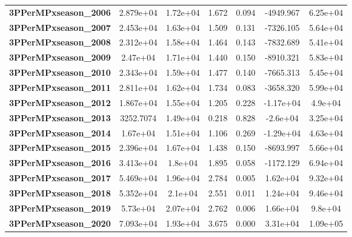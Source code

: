 \begin{center}
\begin{tabular}{lcccccc}
\textbf{3PPerMPxseason\_2006} &    2.879e+04  &     1.72e+04     &     1.672  &         0.094        &    -4949.967    &     6.25e+04     \\
\textbf{3PPerMPxseason\_2007} &    2.453e+04  &     1.63e+04     &     1.509  &         0.131        &    -7326.105    &     5.64e+04     \\
\textbf{3PPerMPxseason\_2008} &    2.312e+04  &     1.58e+04     &     1.464  &         0.143        &    -7832.689    &     5.41e+04     \\
\textbf{3PPerMPxseason\_2009} &     2.47e+04  &     1.71e+04     &     1.440  &         0.150        &    -8910.321    &     5.83e+04     \\
\textbf{3PPerMPxseason\_2010} &    2.343e+04  &     1.59e+04     &     1.477  &         0.140        &    -7665.313    &     5.45e+04     \\
\textbf{3PPerMPxseason\_2011} &    2.811e+04  &     1.62e+04     &     1.734  &         0.083        &    -3658.320    &     5.99e+04     \\
\textbf{3PPerMPxseason\_2012} &    1.867e+04  &     1.55e+04     &     1.205  &         0.228        &    -1.17e+04    &      4.9e+04     \\
\textbf{3PPerMPxseason\_2013} &    3252.7074  &     1.49e+04     &     0.218  &         0.828        &     -2.6e+04    &     3.25e+04     \\
\textbf{3PPerMPxseason\_2014} &     1.67e+04  &     1.51e+04     &     1.106  &         0.269        &    -1.29e+04    &     4.63e+04     \\
\textbf{3PPerMPxseason\_2015} &    2.396e+04  &     1.67e+04     &     1.438  &         0.150        &    -8693.997    &     5.66e+04     \\
\textbf{3PPerMPxseason\_2016} &    3.413e+04  &      1.8e+04     &     1.895  &         0.058        &    -1172.129    &     6.94e+04     \\
\textbf{3PPerMPxseason\_2017} &    5.469e+04  &     1.96e+04     &     2.784  &         0.005        &     1.62e+04    &     9.32e+04     \\
\textbf{3PPerMPxseason\_2018} &    5.352e+04  &      2.1e+04     &     2.551  &         0.011        &     1.24e+04    &     9.46e+04     \\
\textbf{3PPerMPxseason\_2019} &     5.73e+04  &     2.07e+04     &     2.762  &         0.006        &     1.66e+04    &      9.8e+04     \\
\textbf{3PPerMPxseason\_2020} &    7.093e+04  &     1.93e+04     &     3.675  &         0.000        &     3.31e+04    &     1.09e+05     \\

\end{tabular}
\end{center}
